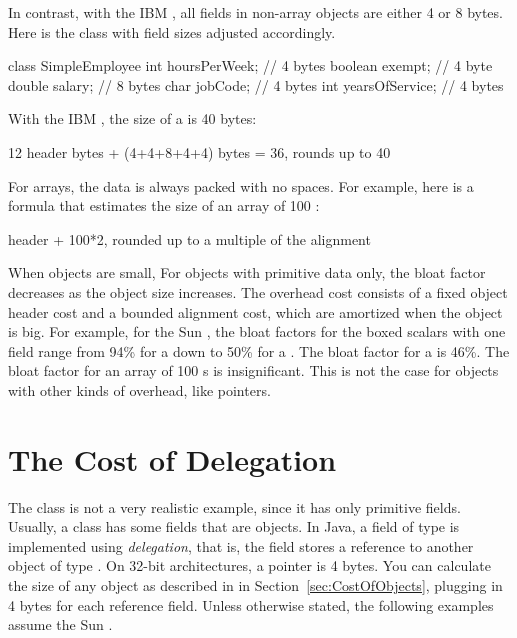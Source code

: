 In contrast, with the IBM \jre, all fields in non-array objects are either 4 or
8 bytes.  Here is the  class with field sizes adjusted
accordingly.
\begin{shortlisting} 
class SimpleEmployee {
    int hoursPerWeek;        // 4 bytes
    boolean exempt;          // 4 byte
    double salary;           // 8 bytes
    char jobCode;            // 4 bytes
    int yearsOfService;      // 4 bytes
}
\end{shortlisting}
With the IBM \jre, the size of a  is 40 bytes:
\begin{shortlisting}
12 header bytes + (4+4+8+4+4) bytes = 36, rounds up to 40
\end{shortlisting}
For arrays, the data is always packed with no spaces. For example, here is a
formula that estimates the size of an array of 100 :
\begin{shortlisting}
header + 100*2, rounded up to a multiple of the alignment
\end{shortlisting}

When objects are small, For objects with primitive data only, the bloat factor
decreases as the object size increases. The overhead cost consists of a fixed
object header cost and a bounded alignment cost, which are amortized when the
object is big.  For example, for the Sun \jre, the bloat factors for the boxed
scalars with one field range from 94\% for a  down to 50\% for a
.  The bloat factor for a  is 46\%.  The
bloat factor for an array of 100 s is insignificant. This is not the
case for objects with other kinds of overhead, like pointers.

\section{The Cost of Delegation}

The  class is not a very realistic example, since it has only
primitive fields. Usually, a class has some fields that are objects.  In Java,
a field of type  is implemented using \textit{delegation},
that is, the field stores a reference to another object of type
. On 32-bit architectures, a pointer is 4 bytes. You can
calculate the size of any object as described in in
Section~\ref{sec:CostOfObjects}, plugging in 4 bytes for each reference field.
Unless otherwise stated, the following examples assume the Sun \jre.

